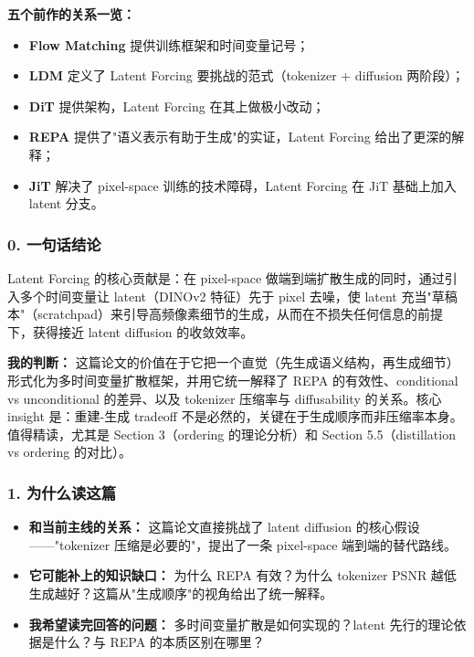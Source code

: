 \begin{conceptbox}
\textbf{五个前作的关系一览：}
\begin{itemize}[leftmargin=1.5em]
  \item \textbf{Flow Matching} 提供训练框架和时间变量记号；
  \item \textbf{LDM} 定义了 Latent Forcing 要挑战的范式（tokenizer + diffusion 两阶段）；
  \item \textbf{DiT} 提供架构，Latent Forcing 在其上做极小改动；
  \item \textbf{REPA} 提供了"语义表示有助于生成"的实证，Latent Forcing 给出了更深的解释；
  \item \textbf{JiT} 解决了 pixel-space 训练的技术障碍，Latent Forcing 在 JiT 基础上加入 latent 分支。
\end{itemize}
\end{conceptbox}

\subsubsection{0. 一句话结论}

Latent Forcing 的核心贡献是：在 pixel-space 做端到端扩散生成的同时，通过引入多个时间变量让 latent（DINOv2 特征）先于 pixel 去噪，使 latent 充当"草稿本"（scratchpad）来引导高频像素细节的生成，从而在不损失任何信息的前提下，获得接近 latent diffusion 的收敛效率。

\begin{summarybox}
\textbf{我的判断：} 这篇论文的价值在于它把一个直觉（先生成语义结构，再生成细节）形式化为多时间变量扩散框架，并用它统一解释了 REPA 的有效性、conditional vs unconditional 的差异、以及 tokenizer 压缩率与 diffusability 的关系。核心 insight 是：重建-生成 tradeoff 不是必然的，关键在于生成顺序而非压缩率本身。值得精读，尤其是 Section 3（ordering 的理论分析）和 Section 5.5（distillation vs ordering 的对比）。
\end{summarybox}

\subsubsection{1. 为什么读这篇}

\begin{itemize}[leftmargin=1.5em]
  \item \textbf{和当前主线的关系：} 这篇论文直接挑战了 latent diffusion 的核心假设——"tokenizer 压缩是必要的"，提出了一条 pixel-space 端到端的替代路线。
  \item \textbf{它可能补上的知识缺口：} 为什么 REPA 有效？为什么 tokenizer PSNR 越低生成越好？这篇从"生成顺序"的视角给出了统一解释。
  \item \textbf{我希望读完回答的问题：} 多时间变量扩散是如何实现的？latent 先行的理论依据是什么？与 REPA 的本质区别在哪里？
\end{itemize}

